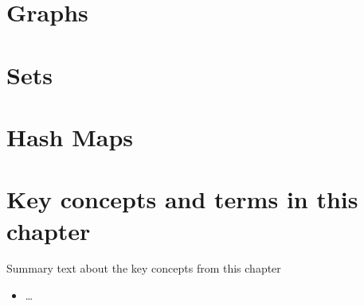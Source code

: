 \documentclass[fsharpNotes.tex]{subfiles}
\begin{document}
\section{Graphs}

\section{Sets}

\section{Hash Maps}

\section{Key concepts and terms in this chapter}
Summary text about the key concepts from this chapter
\begin{itemize}
\item \ldots
\end{itemize}
\end{document}
